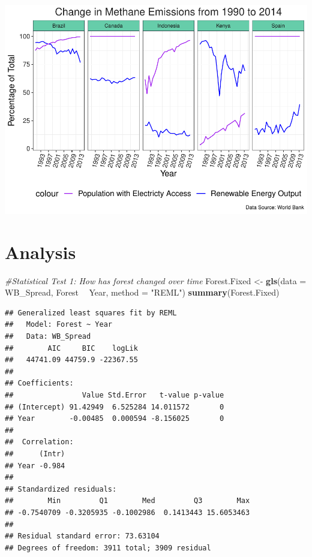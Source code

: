 \documentclass[12pt,]{article}
\newenvironment{Shaded}{\begin{snugshade}}{\end{snugshade}}
\newcommand{\KeywordTok}[1]{\textcolor[rgb]{0.13,0.29,0.53}{\textbf{#1}}}
\newcommand{\DataTypeTok}[1]{\textcolor[rgb]{0.13,0.29,0.53}{#1}}
\newcommand{\StringTok}[1]{\textcolor[rgb]{0.31,0.60,0.02}{#1}}
\newcommand{\CommentTok}[1]{\textcolor[rgb]{0.56,0.35,0.01}{\textit{#1}}}
\newcommand{\OperatorTok}[1]{\textcolor[rgb]{0.81,0.36,0.00}{\textbf{#1}}}
\newcommand{\NormalTok}[1]{#1}
\begin{document}
\includegraphics{Marx_ENV872_Project_files/figure-latex/unnamed-chunk-9-1.pdf}

\newpage

\section{Analysis}\label{analysis}

\begin{Shaded}
\begin{Highlighting}[]
\CommentTok{#Statistical Test 1: How has forest changed over time }
\NormalTok{Forest.Fixed <-}\StringTok{ }\KeywordTok{gls}\NormalTok{(}\DataTypeTok{data =}\NormalTok{ WB_Spread, }
\NormalTok{                    Forest }\OperatorTok{~}\StringTok{ }\NormalTok{Year,}
                    \DataTypeTok{method =} \StringTok{"REML"}\NormalTok{)}
\KeywordTok{summary}\NormalTok{(Forest.Fixed)}
\end{Highlighting}
\end{Shaded}

\begin{verbatim}
## Generalized least squares fit by REML
##   Model: Forest ~ Year 
##   Data: WB_Spread 
##        AIC     BIC    logLik
##   44741.09 44759.9 -22367.55
## 
## Coefficients:
##                Value Std.Error   t-value p-value
## (Intercept) 91.42949  6.525284 14.011572       0
## Year        -0.00485  0.000594 -8.156025       0
## 
##  Correlation: 
##      (Intr)
## Year -0.984
## 
## Standardized residuals:
##        Min         Q1        Med         Q3        Max 
## -0.7540709 -0.3205935 -0.1002986  0.1413443 15.6053463 
## 
## Residual standard error: 73.63104 
## Degrees of freedom: 3911 total; 3909 residual
\end{verbatim}
\end{document}
